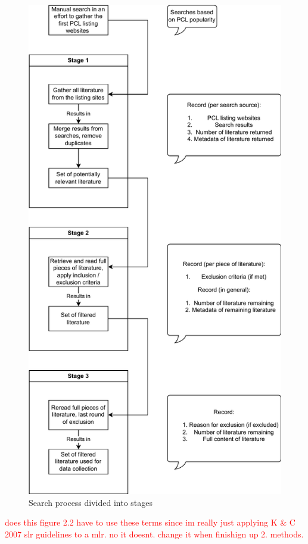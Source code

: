 \begin{figure}
	\centering
	\includegraphics[scale=0.67]{figures/search-process.pdf}
	\caption{Search process divided into stages}
	\label{fig:search-process}
\end{figure}

\textcolor{red}{does this figure 2.2 have to use these terms since im really just applying K \& C 2007 slr guidelines to a mlr. no it doesnt. change it when finishign up 2. methods.}

